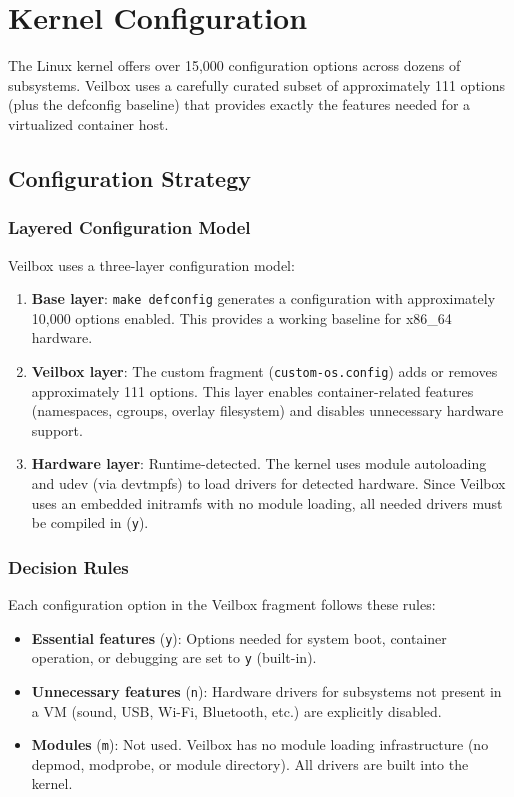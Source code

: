 \chapter{Kernel Configuration}
\label{ch:kernelconfig}

The Linux kernel offers over 15,000 configuration options across dozens
of subsystems. Veilbox uses a carefully curated subset of approximately
111 options (plus the defconfig baseline) that provides exactly the
features needed for a virtualized container host.

\section{Configuration Strategy}

\subsection{Layered Configuration Model}

Veilbox uses a three-layer configuration model:

\begin{enumerate}[nosep]
  \item \textbf{Base layer}: \texttt{make defconfig} generates a
        configuration with approximately 10,000 options enabled. This
        provides a working baseline for x86\_64 hardware.
  \item \textbf{Veilbox layer}: The custom fragment
        (\texttt{custom-os.config}) adds or removes approximately 111
        options. This layer enables container-related features (namespaces,
        cgroups, overlay filesystem) and disables unnecessary hardware
        support.
  \item \textbf{Hardware layer}: Runtime-detected. The kernel uses
        module autoloading and udev (via devtmpfs) to load drivers for
        detected hardware. Since Veilbox uses an embedded initramfs with
        no module loading, all needed drivers must be compiled in (\texttt{y}).
\end{enumerate}

\subsection{Decision Rules}

Each configuration option in the Veilbox fragment follows these rules:

\begin{itemize}[nosep]
  \item \textbf{Essential features} (\texttt{y}): Options needed for system
        boot, container operation, or debugging are set to \texttt{y}
        (built-in).
  \item \textbf{Unnecessary features} (\texttt{n}): Hardware drivers for
        subsystems not present in a VM (sound, USB, Wi-Fi, Bluetooth,
        etc.) are explicitly disabled.
  \item \textbf{Modules} (\texttt{m}): Not used. Veilbox has no module
        loading infrastructure (no depmod, modprobe, or module directory).
        All drivers are built into the kernel.
\end{itemize}

